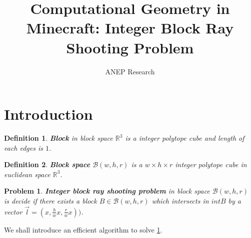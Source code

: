 \documentclass{article}
\title{Computational Geometry in Minecraft: Integer Block Ray Shooting Problem}
\author{ANEP Research}
\newtheorem{define}{Definition}
\newtheorem{problem}{Problem}
\begin{document}
\maketitle
\tableofcontents
\section{Introduction}
\begin{define}
    \textbf{Block} in block space $\mathbb{R}^{3}$ is a integer polytope cube and length of each edges is $1$.
\end{define}
\begin{define}
    \textbf{Block space} $\mathcal{B}(w,h,r)$ is a $w \times h \times r$ integer polytope cube in euclidean space $\mathbb{R}^{3}$.
\end{define}
\begin{problem}
    \label{ibrs}
    \textbf{Integer block ray shooting problem} in block space $\mathcal{B}(w,h,r)$ is
    decide if there exists a block $B \in \mathcal{B}(w,h,r)$ which intersects in $intB$ by a vector $\vec{l} = (x, \frac{h}{w}x, \frac{r}{w}x))$.
\end{problem}
We shall introduce an efficient algorithm to solve \cref{ibrs}.
\pagebreak
\end{document}
